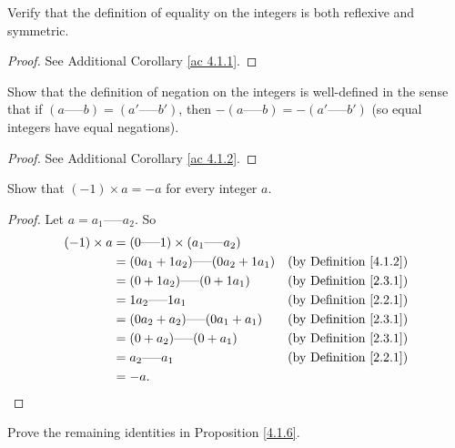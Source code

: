 \exercisesection

\begin{exercise}\label{ex 4.1.1}
Verify that the definition of equality on the integers is both reflexive and symmetric.
\end{exercise}

\begin{proof}
See Additional Corollary \ref{ac 4.1.1}.
\end{proof}

\begin{exercise}\label{ex 4.1.2}
Show that the definition of negation on the integers is well-defined in the sense that if \((a \text{-----} b) = (a' \text{-----} b')\), then \(-(a \text{-----} b) = -(a' \text{-----} b')\)
(so equal integers have equal negations).
\end{exercise}

\begin{proof}
See Additional Corollary \ref{ac 4.1.2}.
\end{proof}

\begin{exercise}\label{ex 4.1.3}
Show that \((-1) \times a = -a\) for every integer \(a\).
\end{exercise}

\begin{proof}
Let \(a = a_1 \text{-----} a_2\).
So
\begin{align*}
(-1) \times a &= (0 \text{-----} 1) \times (a_1 \text{-----} a_2) \\
&= (0a_1 + 1a_2) \text{-----} (0a_2 + 1a_1) & \text{(by Definition \ref{4.1.2})} \\
&= (0 + 1a_2) \text{-----} (0 + 1a_1) & \text{(by Definition \ref{2.3.1})} \\
&= 1a_2 \text{-----} 1a_1 & \text{(by Definition \ref{2.2.1})} \\
&= (0a_2 + a_2) \text{-----} (0a_1 + a_1) & \text{(by Definition \ref{2.3.1})} \\
&= (0 + a_2) \text{-----} (0 + a_1) & \text{(by Definition \ref{2.3.1})} \\
&= a_2 \text{-----} a_1 & \text{(by Definition \ref{2.2.1})} \\
&= -a.
\end{align*}
\end{proof}

\begin{exercise}\label{ex 4.1.4}
Prove the remaining identities in Proposition \ref{4.1.6}.
\end{exercise}

